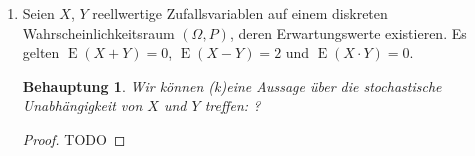 \documentclass[a4paper]{scrartcl}
\newtheorem*{behaupt}{Behauptung}
\newcommand{\e}{\operatorname{E}}
\begin{document}
\begin{enumerate}[label=\bfseries\arabic*.]
\begin{enumerate}[label=(\alph*)]
        \end{enumerate}

    \item
        Seien $X$, $Y$ reellwertige Zufallsvariablen auf einem diskreten
        Wahrscheinlichkeitsraum $(\Omega, P)$, deren Erwartungswerte
        existieren.
        Es gelten $\e(X+Y) = 0$, $\e(X-Y) = 2$ und $\e(X \cdot Y) = 0$.
        \begin{behaupt}
            Wir können (k)eine Aussage über die stochastische Unabhängigkeit
            von $X$ und $Y$ treffen: ?
        \end{behaupt}
        \begin{proof}
            TODO
        \end{proof}

\end{enumerate}
\end{document}

